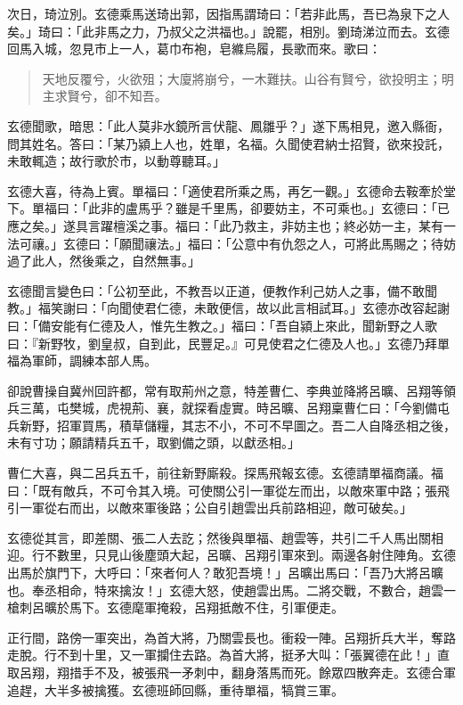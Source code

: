 次日，琦泣別。玄德乘馬送琦出郭，因指馬謂琦曰：「若非此馬，吾已為泉下之人矣。」琦曰：「此非馬之力，乃叔父之洪福也。」說罷，相別。劉琦涕泣而去。玄德回馬入城，忽見市上一人，葛巾布袍，皂縧烏履，長歌而來。歌曰：

\begin{quote}
天地反覆兮，火欲殂；大廈將崩兮，一木難扶。山谷有賢兮，欲投明主；明主求賢兮，卻不知吾。
\end{quote}

玄德聞歌，暗思：「此人莫非水鏡所言伏龍、鳳雛乎？」遂下馬相見，邀入縣衙，問其姓名。答曰：「某乃潁上人也，姓單，名福。久聞使君納士招賢，欲來投託，未敢輒造；故行歌於市，以動尊聽耳。」

玄德大喜，待為上賓。單福曰：「適使君所乘之馬，再乞一觀。」玄德命去鞍牽於堂下。單福曰：「此非的盧馬乎？雖是千里馬，卻要妨主，不可乘也。」玄德曰：「已應之矣。」遂具言躍檀溪之事。福曰：「此乃救主，非妨主也；終必妨一主，某有一法可禳。」玄德曰：「願聞禳法。」福曰：「公意中有仇怨之人，可將此馬賜之；待妨過了此人，然後乘之，自然無事。」

玄德聞言變色曰：「公初至此，不教吾以正道，便教作利己妨人之事，備不敢聞教。」福笑謝曰：「向聞使君仁德，未敢便信，故以此言相試耳。」玄德亦改容起謝曰：「備安能有仁德及人，惟先生教之。」福曰：「吾自潁上來此，聞新野之人歌曰：『新野牧，劉皇叔，自到此，民豐足。』可見使君之仁德及人也。」玄德乃拜單福為軍師，調練本部人馬。

卻說曹操自冀州回許都，常有取荊州之意，特差曹仁、李典並降將呂曠、呂翔等領兵三萬，屯樊城，虎視荊、襄，就探看虛實。時呂曠、呂翔稟曹仁曰：「今劉備屯兵新野，招軍買馬，積草儲糧，其志不小，不可不早圖之。吾二人自降丞相之後，未有寸功；願請精兵五千，取劉備之頭，以獻丞相。」

曹仁大喜，與二呂兵五千，前往新野廝殺。探馬飛報玄德。玄德請單福商議。福曰：「既有敵兵，不可令其入境。可使關公引一軍從左而出，以敵來軍中路；張飛引一軍從右而出，以敵來軍後路；公自引趙雲出兵前路相迎，敵可破矣。」

玄德從其言，即差關、張二人去訖；然後與單福、趙雲等，共引二千人馬出關相迎。行不數里，只見山後塵頭大起，呂曠、呂翔引軍來到。兩邊各射住陣角。玄德出馬於旗門下，大呼曰：「來者何人？敢犯吾境！」呂曠出馬曰：「吾乃大將呂曠也。奉丞相命，特來擒汝！」玄德大怒，使趙雲出馬。二將交戰，不數合，趙雲一槍刺呂曠於馬下。玄德麾軍掩殺，呂翔抵敵不住，引軍便走。

正行間，路傍一軍突出，為首大將，乃關雲長也。衝殺一陣。呂翔折兵大半，奪路走脫。行不到十里，又一軍攔住去路。為首大將，挺矛大叫：「張翼德在此！」直取呂翔，翔措手不及，被張飛一矛刺中，翻身落馬而死。餘眾四散奔走。玄德合軍追趕，大半多被擒獲。玄德班師回縣，重待單福，犒賞三軍。


